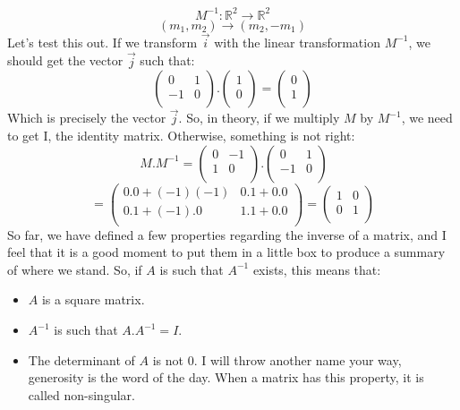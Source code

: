 \documentclass[600paper, 11pt,twoside,openany]{kdp}
\begin{document}
\[M^{-1}:\mathbb{R}^2 \rightarrow \mathbb{R}^2\]
\[(m_1,m_2) \rightarrow (m_2, -m_1) \]
\indent Let’s test this out. If we transform $\overrightarrow{i}$ with the linear transformation $M^{−1}$, we should get the vector  $\overrightarrow{j}$ such that:
\[\begin{pmatrix}
0 & 1 \\
-1 & 0 \\
\end{pmatrix}.\begin{pmatrix}
1  \\
0 \\
\end{pmatrix} = \begin{pmatrix}
0 \\
1 \\
\end{pmatrix}
\]
\indent Which is precisely the vector $\overrightarrow{j}$. So, in theory, if we multiply $M$ by $M^{−1}$, we need to get I, the identity matrix. Otherwise, something is not right:
\[~M.M^{-1} = \begin{pmatrix}
0 & -1\\
1 & 0\\
\end{pmatrix}. \begin{pmatrix}
0 & 1 \\
-1 & 0 \\
\end{pmatrix}
\]
\[ = \begin{pmatrix}
0.0 + (-1)(-1) & 0.1 + 0.0\\
0.1 + (-1).0  & 1.1 + 0.0\\
\end{pmatrix} = \begin{pmatrix}
1 & 0\\
0 & 1\\
\end{pmatrix}\]
\indent So far, we have defined a few properties regarding the inverse of a matrix, and I feel that it is a good moment to put them in a little box to produce a summary of where we stand. So, if $A$ is such that $A^{−1}$ exists, this means that:
\begin{tcolorbox}
\begin{itemize}
\item $A$ is a square matrix.
\item $A^{-1}$ is such that $A.A^{-1} = I $.
\item The determinant of $A$ is not 0. I will throw another name your way, generosity is the word of the day. When a matrix has this property, it is called non-singular.
\end{itemize}
\end{tcolorbox}
\end{document}
